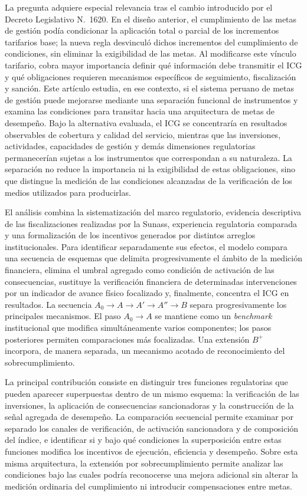 La pregunta adquiere especial relevancia tras el cambio introducido por el Decreto Legislativo N.\textdegree~1620. En el diseño anterior, el cumplimiento de las metas de gestión podía condicionar la aplicación total o parcial de los incrementos tarifarios base; la nueva regla desvinculó dichos incrementos del cumplimiento de condiciones, sin eliminar la exigibilidad de las metas. Al modificarse este vínculo tarifario, cobra mayor importancia definir qué información debe transmitir el ICG y qué obligaciones requieren mecanismos específicos de seguimiento, fiscalización y sanción. Este artículo estudia, en ese contexto, si el sistema peruano de metas de gestión puede mejorarse mediante una separación funcional de instrumentos y examina las condiciones para transitar hacia una arquitectura de metas de desempeño. Bajo la alternativa evaluada, el ICG se concentraría en resultados observables de cobertura y calidad del servicio, mientras que las inversiones, actividades, capacidades de gestión y demás dimensiones regulatorias permanecerían sujetas a los instrumentos que correspondan a su naturaleza. La separación no reduce la importancia ni la exigibilidad de estas obligaciones, sino que distingue la medición de las condiciones alcanzadas de la verificación de los medios utilizados para producirlas.

El análisis combina la sistematización del marco regulatorio, evidencia descriptiva de las fiscalizaciones realizadas por la Sunass, experiencia regulatoria comparada y una formalización de los incentivos generados por distintos arreglos institucionales. Para identificar separadamente sus efectos, el modelo compara una secuencia de esquemas que delimita progresivamente el ámbito de la medición financiera, elimina el umbral agregado como condición de activación de las consecuencias, sustituye la verificación financiera de determinadas intervenciones por un indicador de avance físico focalizado y, finalmente, concentra el ICG en resultados. La secuencia \(A_0\to A\to A'\to A''\to B\) separa progresivamente los principales mecanismos. El paso \(A_0\to A\) se mantiene como un \textit{benchmark} institucional que modifica simultáneamente varios componentes; los pasos posteriores permiten comparaciones más focalizadas. Una extensión \(B^{+}\) incorpora, de manera separada, un mecanismo acotado de reconocimiento del sobrecumplimiento.

La principal contribución consiste en distinguir tres funciones regulatorias que pueden aparecer superpuestas dentro de un mismo esquema: la verificación de las inversiones, la aplicación de consecuencias sancionadoras y la construcción de la señal agregada de desempeño. La comparación secuencial permite examinar por separado los canales de verificación, de activación sancionadora y de composición del índice, e identificar si y bajo qué condiciones la superposición entre estas funciones modifica los incentivos de ejecución, eficiencia y desempeño. Sobre esta misma arquitectura, la extensión por sobrecumplimiento permite analizar las condiciones bajo las cuales podría reconocerse una mejora adicional sin alterar la medición ordinaria del cumplimiento ni introducir compensaciones entre metas.

